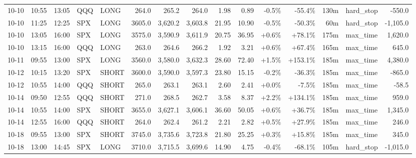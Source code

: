 \documentclass[11pt,a4paper,twoside]{article}
\begin{document}
\begin{landscape}
\begin{center}
\begin{longtable}{>{\color{txtmain}}l l l l l r r r r r r r r >{\color{txtmain}}l r}
10-10 & 10:55 & 13:05 & QQQ & LONG & 264.0 & 265.2 & 264.0 & 1.98 & 0.89 & \textcolor{lossred}{-0.5\%} & \textcolor{lossred}{-55.4\%} & 130m & hard\_stop & \textcolor{lossred}{-550.0} \\
10-10 & 11:25 & 12:25 & SPX & LONG & 3605.0 & 3,620.2 & 3,603.8 & 21.95 & 10.90 & \textcolor{lossred}{-0.5\%} & \textcolor{lossred}{-50.3\%} & 60m & hard\_stop & \textcolor{lossred}{-1,105.0} \\
10-10 & 13:05 & 16:00 & SPX & LONG & 3575.0 & 3,590.9 & 3,611.9 & 20.75 & 36.95 & \textcolor{wingreen}{+0.6\%} & \textcolor{wingreen}{+78.1\%} & 175m & max\_time & \textcolor{wingreen}{1,620.0} \\
10-10 & 13:15 & 16:00 & QQQ & LONG & 263.0 & 264.6 & 266.2 & 1.92 & 3.21 & \textcolor{wingreen}{+0.6\%} & \textcolor{wingreen}{+67.4\%} & 165m & max\_time & \textcolor{wingreen}{645.0} \\
10-11 & 09:55 & 13:00 & SPX & LONG & 3560.0 & 3,580.0 & 3,632.3 & 28.60 & 72.40 & \textcolor{wingreen}{+1.5\%} & \textcolor{wingreen}{+153.1\%} & 185m & max\_time & \textcolor{wingreen}{4,380.0} \\
10-12 & 10:15 & 13:20 & SPX & SHORT & 3600.0 & 3,590.0 & 3,597.3 & 23.80 & 15.15 & \textcolor{lossred}{-0.2\%} & \textcolor{lossred}{-36.3\%} & 185m & max\_time & \textcolor{lossred}{-865.0} \\
10-12 & 10:55 & 14:00 & QQQ & SHORT & 265.0 & 263.1 & 263.1 & 2.60 & 2.41 & \textcolor{wingreen}{+0.0\%} & \textcolor{lossred}{-7.5\%} & 185m & max\_time & \textcolor{lossred}{-58.5} \\
10-14 & 09:50 & 12:55 & QQQ & SHORT & 271.0 & 268.5 & 262.7 & 3.58 & 8.37 & \textcolor{wingreen}{+2.2\%} & \textcolor{wingreen}{+134.1\%} & 185m & max\_time & \textcolor{wingreen}{959.0} \\
10-14 & 10:55 & 14:00 & SPX & SHORT & 3655.0 & 3,627.1 & 3,606.1 & 36.60 & 50.05 & \textcolor{wingreen}{+0.6\%} & \textcolor{wingreen}{+36.7\%} & 185m & max\_time & \textcolor{wingreen}{1,345.0} \\
10-14 & 12:55 & 16:00 & QQQ & SHORT & 264.0 & 262.4 & 261.2 & 2.21 & 2.82 & \textcolor{wingreen}{+0.5\%} & \textcolor{wingreen}{+27.9\%} & 185m & max\_time & \textcolor{wingreen}{246.0} \\
10-18 & 09:55 & 13:00 & SPX & SHORT & 3745.0 & 3,735.6 & 3,723.8 & 21.80 & 25.25 & \textcolor{wingreen}{+0.3\%} & \textcolor{wingreen}{+15.8\%} & 185m & max\_time & \textcolor{wingreen}{345.0} \\
10-18 & 13:00 & 14:45 & SPX & LONG & 3710.0 & 3,715.5 & 3,699.6 & 14.90 & 4.75 & \textcolor{lossred}{-0.4\%} & \textcolor{lossred}{-68.1\%} & 105m & hard\_stop & \textcolor{lossred}{-1,015.0} \\

\end{longtable}
\end{center}
\end{landscape}
\end{document}
